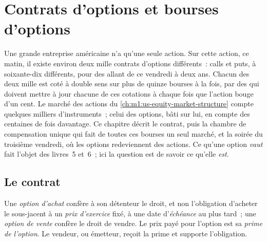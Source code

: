 \chapter{Contrats d'options et bourses d'options}\label{ch:m1:option-contracts-and-exchanges}

Une grande entreprise américaine n'a qu'une seule action. Sur cette action, ce matin, il existe
environ deux mille contrats d'options différents~: calls et puts, à soixante-dix
 différents, pour des  allant de ce vendredi à deux ans. Chacun des
deux mille est coté à double sens sur plus de quinze bourses à la fois,
par des  qui doivent mettre à jour chacune de ces cotations à chaque
fois que l'action bouge d'un cent. Le marché des actions du \cref{ch:m1:us-equity-market-structure}
compte quelques milliers d'instruments~; celui des options, bâti sur lui, en
compte des centaines de fois davantage. Ce chapitre décrit le contrat, puis la
chambre de compensation unique qui fait de toutes ces bourses un seul marché, et la
soirée du troisième vendredi, où les options redeviennent des actions. Ce qu'une option
\emph{vaut} fait l'objet des livres~5 et~6~; ici la question est
de savoir ce qu'elle \emph{est}.

\section{Le contrat}

\begin{definition}\label{def:m1:option-contracts-and-exchanges:option}
Une \emph{option d'achat} confère à son détenteur le droit, et non
l'obligation d'acheter le sous-jacent à un \emph{prix d'exercice} fixé, à
une date d'\emph{échéance} au plus tard~; une \emph{option de vente} confère
le droit de vendre. Le prix payé pour l'option est sa
\emph{prime de l'option}. Le vendeur, ou émetteur, reçoit la
prime et supporte l'obligation.
\end{definition}

